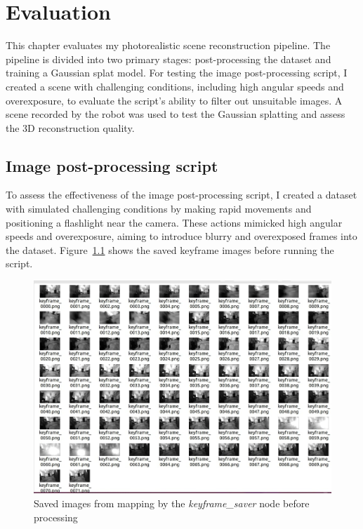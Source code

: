 \chapter{Evaluation} \label{evaluation}

This chapter evaluates my photorealistic scene reconstruction pipeline. The pipeline is divided into two primary stages: post-processing the dataset and training a Gaussian splat model. For testing the image post-processing script, I created a scene with challenging conditions, including high angular speeds and overexposure, to evaluate the script's ability to filter out unsuitable images. A scene recorded by the robot was used to test the Gaussian splatting and assess the 3D reconstruction quality. 

\section{Image post-processing script}

To assess the effectiveness of the image post-processing script, I created a dataset with simulated challenging conditions by making rapid movements and positioning a flashlight near the camera. These actions mimicked high angular speeds and overexposure, aiming to introduce blurry and overexposed frames into the dataset. Figure~\ref{fig:keyframes_before_process} shows the saved keyframe images before running the script.

\FloatBarrier
\begin{figure}[htbp]
	\centering
	\includegraphics[width=150mm, keepaspectratio]{figures_jpg/keyframes_before_process.jpg}
	\caption{Saved images from mapping by the \textit{keyframe\_saver} node before processing}
	\label{fig:keyframes_before_process}
\end{figure}
\FloatBarrier

